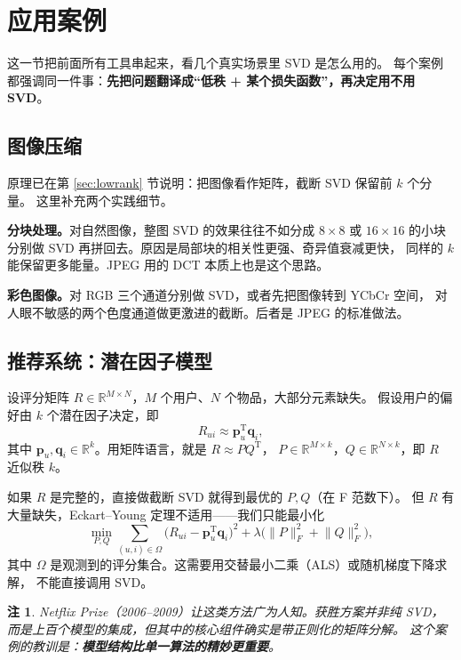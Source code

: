 \documentclass[UTF8, 11pt, a4paper, fontset=windows]{ctexart}
\theoremstyle{cnthm}
\theoremstyle{cndef}
\newtheorem{rem}[defn]{注}
\newcommand{\T}{^{\mathrm{T}}}
\newcommand{\R}{\mathbb{R}}
\newcommand{\nrm}[1]{\lVert #1 \rVert}
\begin{document}
\section{应用案例}\label{sec:app}

这一节把前面所有工具串起来，看几个真实场景里 SVD 是怎么用的。
每个案例都强调同一件事：\textbf{先把问题翻译成“低秩 + 某个损失函数”，再决定用不用 SVD}。

\subsection{图像压缩}

原理已在第 \ref{sec:lowrank} 节说明：把图像看作矩阵，截断 SVD 保留前 $k$ 个分量。
这里补充两个实践细节。

\textbf{分块处理。}对自然图像，整图 SVD 的效果往往不如分成 $8\times8$ 或 $16\times16$
的小块分别做 SVD 再拼回去。原因是局部块的相关性更强、奇异值衰减更快，
同样的 $k$ 能保留更多能量。JPEG 用的 DCT 本质上也是这个思路。

\textbf{彩色图像。}对 RGB 三个通道分别做 SVD，或者先把图像转到 YCbCr 空间，
对人眼不敏感的两个色度通道做更激进的截断。后者是 JPEG 的标准做法。

\subsection{推荐系统：潜在因子模型}

设评分矩阵 $R\in\R^{M\times N}$，$M$ 个用户、$N$ 个物品，大部分元素缺失。
假设用户的偏好由 $k$ 个潜在因子决定，即
\begin{equation}
  R_{ui}\approx \mathbf{p}_u\T\mathbf{q}_i ,
\end{equation}
其中 $\mathbf{p}_u,\mathbf{q}_i\in\R^{k}$。用矩阵语言，就是 $R\approx PQ\T$，
$P\in\R^{M\times k}$，$Q\in\R^{N\times k}$，即 $R$ 近似秩 $k$。

如果 $R$ 是完整的，直接做截断 SVD 就得到最优的 $P,Q$（在 F 范数下）。
但 $R$ 有大量缺失，Eckart--Young 定理不适用——我们只能最小化
\begin{equation}
  \min_{P,Q}\sum_{(u,i)\in\Omega}\big(R_{ui}-\mathbf{p}_u\T\mathbf{q}_i\big)^2
  +\lambda\big(\nrm{P}_F^2+\nrm{Q}_F^2\big),
\end{equation}
其中 $\Omega$ 是观测到的评分集合。这需要用交替最小二乘（ALS）或随机梯度下降求解，
不能直接调用 SVD。

\begin{rem}
Netflix Prize（2006--2009）让这类方法广为人知。获胜方案并非纯 SVD，
而是上百个模型的集成，但其中的核心组件确实是带正则化的矩阵分解。
这个案例的教训是：\textbf{模型结构比单一算法的精妙更重要}。
\end{rem}
\end{document}
